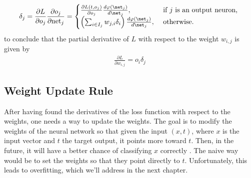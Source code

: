 \documentclass{article}
\begin{document}
\begin{enumerate}
\begin{equation*}
  \begin{split}
    \delta_j = {\frac {\partial L}{\partial o_{j}}}{\frac {\partial o_{j}}{\partial {\text{net}}_{j}}}= 
    \begin{cases}
      \frac{\partial {L(t, o_j)}}{\partial {o_j}} \frac{d {\varphi (\net_j)}}{d {\net_j}}, &\text{ if } j \text{ is an output neuron, }\\
      \left( \sum^{}_{i\in I_j} w_{j,i} \delta_i\right) \frac{d {\varphi (\net_j)}}{d {\net_j}} {}, &\text{ otherwise.} 
    \end{cases}
  \end{split}
\end{equation*}
to conclude that the partial derivative of $L$ with respect to the weight $w_{i,j}$ is given by 
\begin{equation*}
  \begin{split}
    \frac{\partial {L}}{\partial {w_{i,j}}} = o_i \delta_j
  \end{split}
\end{equation*}
      \end{enumerate}
\subsection{Weight Update Rule}%
  \label{sub:Weight Update Rule}
  After having found the derivatives of the loss function with respect to the weights, one needs a way to update the weights. The goal is to modify the weights of the neural network so that given the input $(x,t)$, where $x$ is the input vector and $t$ the target output, it points more toward $t$. Then, in the future, it will have a better chance of classifying $x$ correctly \citep{Hagan_Martin}. The naive way would be to set the weights so that they point directly to $t$. Unfortunately, this leads to overfitting, which we'll address in the next chapter.
  
\end{document}
